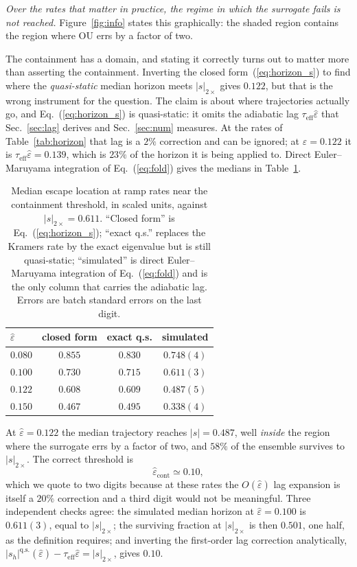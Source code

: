 \documentclass[%
 aip,
 cha,
 amsmath,amssymb,
 reprint,
 superscriptaddress,
 floatfix,
]{revtex4-2}
\newcommand{\Sig}{\hat\varepsilon}
\begin{document}
\emph{Over the rates that matter in practice, the regime in which the surrogate fails is not reached.}  Figure~\ref{fig:info} states this graphically: the shaded region contains the region where OU errs by a factor of two.

The containment has a domain, and stating it correctly turns out to matter more than asserting the containment.  Inverting the closed form~(\ref{eq:horizon_s}) to find where the \emph{quasi-static} median horizon meets $|s|_{2\times}$ gives $0.122$, but that is the wrong instrument for the question.  The claim is about where trajectories actually go, and Eq.~(\ref{eq:horizon_s}) is quasi-static: it omits the adiabatic lag $\tau_{\mathrm{eff}}\Sig$ that Sec.~\ref{sec:lag} derives and Sec.~\ref{sec:num} measures.  At the rates of Table~\ref{tab:horizon} that lag is a $2\%$ correction and can be ignored; at $\Sig=0.122$ it is $\tau_{\mathrm{eff}}\Sig=0.139$, which is $23\%$ of the horizon it is being applied to.  Direct Euler--Maruyama integration of Eq.~(\ref{eq:fold}) gives the medians in Table~\ref{tab:containment}.
\begin{table}[b]
\caption{\label{tab:containment}%
Median escape location at ramp rates near the containment threshold, in scaled units, against $|s|_{2\times}=0.611$.  ``Closed form'' is Eq.~(\ref{eq:horizon_s}); ``exact q.s.'' replaces the Kramers rate by the exact eigenvalue but is still quasi-static; ``simulated'' is direct Euler--Maruyama integration of Eq.~(\ref{eq:fold}) and is the only column that carries the adiabatic lag.  Errors are batch standard errors on the last digit.}
\begin{ruledtabular}
\begin{tabular}{lccc}
\hline
$\Sig$ & closed form & exact q.s. & simulated \\
\hline
$0.080$ & $0.855$ & $0.830$ & $0.748(4)$ \\
$0.100$ & $0.730$ & $0.715$ & $0.611(3)$ \\
$0.122$ & $0.608$ & $0.609$ & $0.487(5)$ \\
$0.150$ & $0.467$ & $0.495$ & $0.338(4)$ \\
\end{tabular}
\end{ruledtabular}
\end{table}
At $\Sig=0.122$ the median trajectory reaches $|s|=0.487$, well \emph{inside} the region where the surrogate errs by a factor of two, and $58\%$ of the ensemble survives to $|s|_{2\times}$.  The correct threshold is
\begin{equation}
\label{eq:sigcont}
\Sig_{\mathrm{cont}}\simeq0.10 ,
\end{equation}
which we quote to two digits because at these rates the $O(\Sig)$ lag expansion is itself a $20\%$ correction and a third digit would not be meaningful.  Three independent checks agree: the simulated median horizon at $\Sig=0.100$ is $0.611(3)$, equal to $|s|_{2\times}$; the surviving fraction at $|s|_{2\times}$ is then $0.501$, one half, as the definition requires; and inverting the first-order lag correction analytically, $|s_h|^{\mathrm{q.s.}}(\Sig)-\tau_{\mathrm{eff}}\Sig=|s|_{2\times}$, gives $0.10$.
\end{document}
